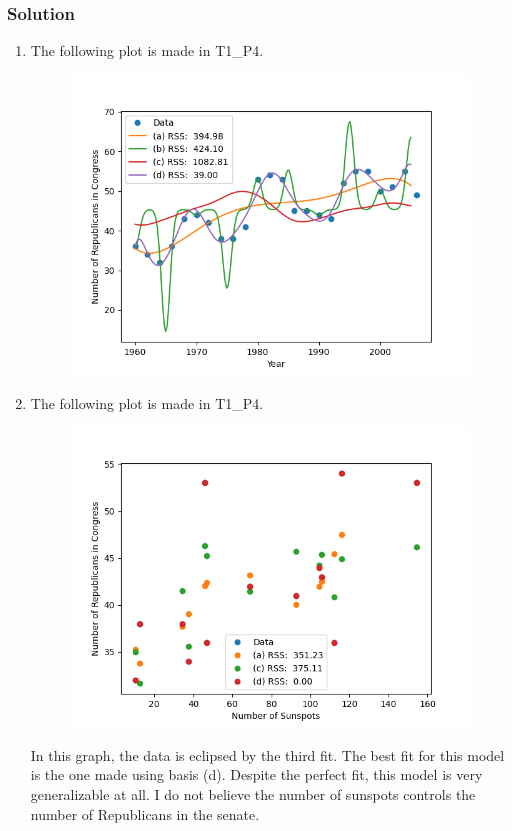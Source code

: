 \documentclass[submit]{harvardml}
\begin{document}
\newpage
\subsubsection*{Solution}

\begin{enumerate}

\item The following plot is made in T1\_P4.

\begin{figure}[h]
\includegraphics[scale=0.8]{P4_1}
\centering
\end{figure}

\newpage
\item The following plot is made in T1\_P4.

\begin{figure}[h]
\includegraphics[scale=0.8]{P4_2}
\centering
\end{figure}

In this graph, the data is eclipsed by the third fit. The best fit for this 
model is the one made using basis (d). Despite the perfect fit, this model
is very generalizable at all. I do not believe the number of sunspots controls
the number of Republicans in the senate.

\end{enumerate}
\end{document}
